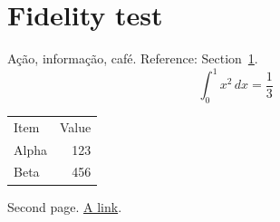 \documentclass{article}\usepackage[margin=25mm]{geometry}\usepackage{amsmath}\usepackage{hyperref}
\begin{document}
\section{Fidelity test}\label{sec:first}Ação, informação, café. Reference: Section~\ref{sec:first}.
\[\int_0^1 x^2\,dx=\frac13\]
\begin{tabular}{lr}Item & Value\\Alpha & 123\\Beta & 456\end{tabular}
\newpage Second page. \href{https://example.com}{A link}.
\end{document}
